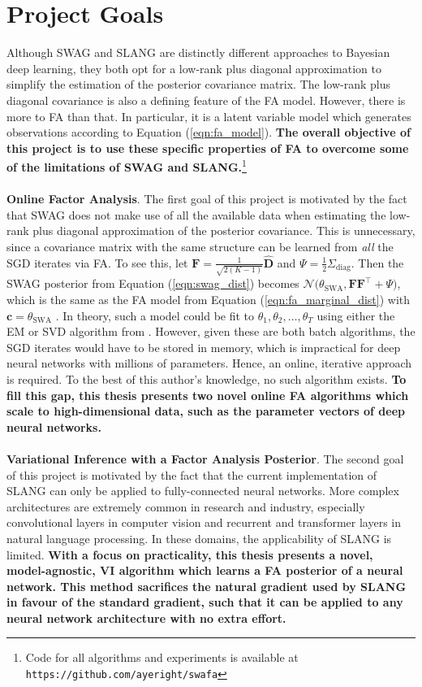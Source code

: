 \documentclass[msc,deptreport.inf]{infthesis} %
\newcommand{\matr}[1]{\mathbf{#1}}
\begin{document}
\section{Project Goals}

Although SWAG and SLANG are distinctly different approaches to Bayesian deep learning, they both opt for a low-rank plus diagonal approximation to simplify the estimation of the posterior covariance matrix. The low-rank plus diagonal covariance is also a defining feature of the FA model. However, there is more to FA than that. In particular, it is a latent variable model which generates observations according to Equation (\ref{eqn:fa_model}). \textbf{The overall objective of this project is to use these specific properties of FA to overcome some of the limitations of SWAG and SLANG.}\footnote{Code for all algorithms and experiments is available at \texttt{https://github.com/ayeright/swafa}}
\\ \\
\textbf{Online Factor Analysis}.
The first goal of this project is motivated by the fact that SWAG does not make use of all the available data when estimating the low-rank plus diagonal approximation of the posterior covariance. This is unnecessary, since a covariance matrix with the same structure can be learned from \emph{all} the SGD iterates via FA. To see this, let $\matr{F} = \frac{1}{\sqrt{2(K-1)}} \hat{\matr{D}}$ and $\Psi = \frac{1}{2} \Sigma_\text{diag}$. Then the SWAG posterior from Equation (\ref{eqn:swag_dist}) becomes $\mathcal{N}\big(\theta_\text{SWA}, \matr{FF}^{\intercal} + \Psi\big)$,
which is the same as the FA model from Equation (\ref{eqn:fa_marginal_dist}) with $\matr{c} = \theta_\text{SWA}$ \cite{brownlie2021}. In theory, such a model could be fit to $\theta_1, \theta_2, \dots, \theta_T$ using either the EM or SVD algorithm from \cite{barber2007}. However, given these are both batch algorithms, the SGD iterates would have to be stored in memory, which is impractical for deep neural networks with millions of parameters. Hence, an online, iterative approach is required. To the best of this author's knowledge, no such algorithm exists. \textbf{To fill this gap, this thesis presents two novel online FA algorithms which scale to high-dimensional data, such as the parameter vectors of deep neural networks.}
\\ \\
\textbf{Variational Inference with a Factor Analysis Posterior}.
The second goal of this project is motivated by the fact that the current implementation of SLANG can only be applied to fully-connected neural networks. More complex architectures are extremely common in research and industry, especially convolutional layers \cite{krizhevsky09} in computer vision and recurrent \cite{hochreiter1997} and transformer \cite{vaswani2017} layers in natural language processing. In these domains, the applicability of SLANG is limited. \textbf{With a focus on practicality, this thesis presents a novel, model-agnostic, VI algorithm which learns a FA posterior of a neural network. This method sacrifices the natural gradient used by SLANG in favour of the standard gradient, such that it can be applied to any neural network architecture with no extra effort.} 
\end{document}

